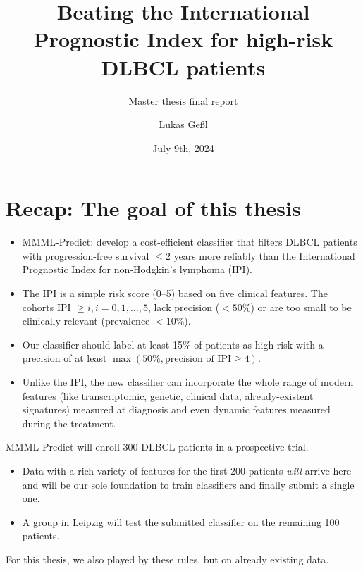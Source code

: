 \documentclass[10pt, aspectratio=169]{beamer}
\title{Beating the International Prognostic Index for high-risk DLBCL patients}
\subtitle{Master thesis final report}
\date{July 9th, 2024}
\author{Lukas Geßl}
\institute{Chair of Statistical Bioinformatics, Regensburg University}
\begin{document}
\maketitle

\section{Recap: The goal of this thesis}

\begin{frame}{}
  \begin{itemize}
    \item MMML-Predict: develop a cost-efficient classifier 
    that filters DLBCL patients with progression-free survival $\leq 2$ years more reliably 
    than the International Prognostic Index for non-Hodgkin's lymphoma (IPI).
    \pause
    \item The IPI \cite{ipi93} is a simple risk score (0--5) based on five clinical features. 
    The cohorts IPI $\geq i, i = 0, 1, \ldots, 5$, lack precision ($< 50 \%$) or 
    are too small to be clinically relevant (prevalence $< 10 \%$).
    \item Our classifier should label at least 15\% of patients as high-risk with a precision
    of at least $\max(50\%, \text{precision of IPI} \geq 4)$.
    \pause
    \item Unlike the IPI, the new classifier can incorporate the whole range of 
    modern features (like transcriptomic, genetic, clinical data, already-existent 
    signatures) measured at diagnosis and even dynamic features measured during 
    the treatment.
  \end{itemize}
\end{frame}

\begin{frame}
  MMML-Predict will enroll 300 DLBCL patients in a prospective trial.
  \begin{itemize}
    \item Data with a rich variety of features for the first 200 patients 
      \textit{will} arrive here and will be our sole foundation to train 
        classifiers and finally submit a single one.
    \item A group in Leipzig will test the submitted classifier on the remaining 
      100 patients.
  \end{itemize}
  \pause
  For this thesis, we also played by these rules, but on already existing data.
\end{frame}
\end{document}
